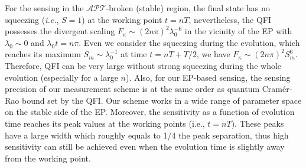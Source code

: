 \documentclass[twocolumn,prl,floatfix,citeautoscript,nofootinbib,superscriptaddress]{revtex4}
\begin{document}
\begin{widetext}
For the sensing in the $\mathcal{APT}$-broken (stable) region, the final
state has no squeezing (\textit{i.e.}, $S=1$) at the working point $t=nT$,
nevertheless, the QFI possesses the divergent scaling $F_{\kappa }\sim
(2n\pi)^2 \lambda _{0}^{-6}$ in the vicinity of the EP with $\lambda_0\sim0$
and $\lambda_0t=n\pi$. Even we consider the squeezing during the evolution,
which reaches its maximum $S_m\sim \lambda_0^{-1}$ at time $t=nT+T/2$, we
have $F_{\kappa }\sim(2n\pi)^2 S_{m}^{6}$. Therefore, QFI can be very large
without strong squeezing during the whole evolution (especially for a large $%
n$).
Also, for our EP-based sensing, the sensing precision of our measurement
scheme is at the same order as quantum Cram\'er-Rao bound set by the QFI.
Our scheme works in a wide range of parameter space on the stable side of
the EP. Moreover, the sensitivity as a function of evolution time reaches
its peak values at the working points (i.e., $t=nT$). These peaks have a
large width which roughly equals to 1/4 the peak separation, thus high
sensitivity can still be achieved even when the evolution time is slightly
away from the working point.


\end{widetext}
\end{document}
